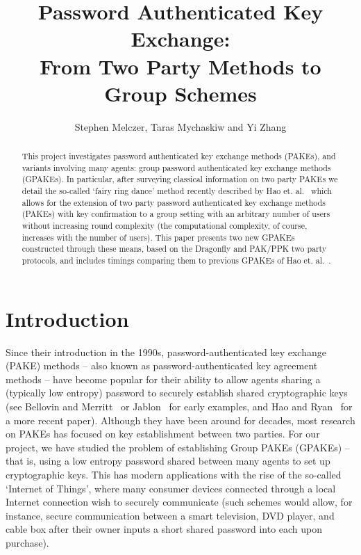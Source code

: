 \documentclass{amsart}
\author{Stephen Melczer, Taras Mychaskiw and Yi Zhang}
\title{Password Authenticated Key Exchange:\\ From Two Party Methods to Group Schemes}
\theoremstyle{remark}
\begin{document}
\begin{abstract}
This project investigates password authenticated key exchange methods (PAKEs), and variants involving many agents:
group password authenticated key exchange methods (GPAKEs).  In 
particular, after surveying classical information on two party PAKEs we detail the so-called `fairy ring dance' method recently described by 
Hao et. al.~\cite{HaYiChSh15} which allows for the extension of two party password authenticated key exchange 
methods (PAKEs) with key confirmation to a group setting with an arbitrary number of users without
increasing round complexity (the computational complexity, of course, increases with the number of users).  
This paper presents two new GPAKEs constructed through these means, based on the 
Dragonfly and PAK/PPK two party protocols, and includes timings comparing them to previous GPAKEs of
Hao et. al.~\cite{HaYiChSh15}.
\end{abstract}

\maketitle


\section{Introduction}

Since their introduction in the 1990s, password-authenticated key exchange (PAKE) methods -- 
also known as password-authenticated key agreement methods -- have become popular for their 
ability to allow agents sharing a (typically low entropy) password to securely establish shared 
cryptographic keys (see Bellovin and Merritt~\cite{BeMe92} or Jablon~\cite{Ja96} for early examples, 
and Hao and Ryan~\cite{HaRy2010} for a more recent paper).  Although they have been around for decades, 
most research on PAKEs has focused on key establishment between two parties.  For our project, we 
have studied the problem of establishing Group PAKEs (GPAKEs) -- that is, using a low entropy password 
shared between many agents to set up cryptographic keys.  This has modern applications with the rise
of the so-called `Internet of Things', where many consumer devices connected through a local Internet 
connection wish to securely communicate (such schemes would allow, for instance, secure communication 
between a smart television, DVD player, and cable box after their owner inputs a short shared password 
into each upon purchase).
\\
\end{document}
